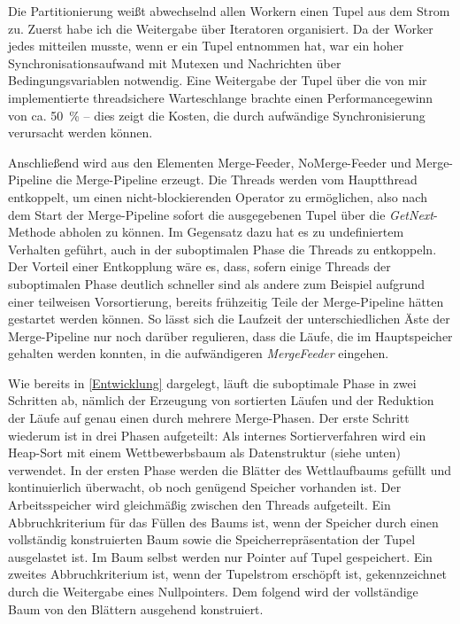 \documentclass[a4paper,12pt,twoside]{article}
\newcommand{\Fb}[1]{\textit{#1}} %
\begin{document}
Die Partitionierung weißt abwechselnd allen Workern einen Tupel aus dem Strom zu. Zuerst habe ich die Weitergabe über Iteratoren organisiert. Da der Worker jedes mitteilen musste, wenn er ein Tupel entnommen hat, war ein hoher Synchronisationsaufwand mit Mutexen und Nachrichten über Bedingungsvariablen notwendig. Eine Weitergabe der Tupel über die von mir implementierte threadsichere Warteschlange brachte einen Performancegewinn von ca. 50~\% -- dies zeigt die Kosten, die durch aufwändige Synchronisierung verursacht werden können.

Anschließend wird aus den Elementen Merge-Feeder, NoMerge-Feeder und Merge-Pipeline die Merge-Pipeline erzeugt. Die Threads werden vom Hauptthread entkoppelt, um einen nicht-blockierenden Operator zu ermöglichen, also nach dem Start der Merge-Pipeline sofort die ausgegebenen Tupel über die \Fb{GetNext}-Methode abholen zu können. Im Gegensatz dazu hat es zu undefiniertem Verhalten geführt, auch in der suboptimalen Phase die Threads zu entkoppeln. Der Vorteil einer Entkopplung wäre es, dass, sofern einige Threads der suboptimalen Phase deutlich schneller sind als andere zum Beispiel aufgrund einer teilweisen Vorsortierung, bereits frühzeitig Teile der Merge-Pipeline hätten gestartet werden können. So lässt sich die Laufzeit der unterschiedlichen Äste der Merge-Pipeline nur noch darüber regulieren, dass die Läufe, die im Hauptspeicher gehalten werden konnten, in die aufwändigeren \Fb{MergeFeeder} eingehen.

Wie bereits in \autoref{Entwicklung} dargelegt, läuft die suboptimale Phase in zwei Schritten ab, nämlich der Erzeugung von sortierten Läufen und der Reduktion der Läufe auf genau einen durch mehrere Merge-Phasen. Der erste Schritt wiederum ist in drei Phasen aufgeteilt: Als internes Sortierverfahren wird ein Heap-Sort mit einem Wettbewerbsbaum als Datenstruktur (siehe unten) verwendet. In der ersten Phase werden die Blätter des Wettlaufbaums gefüllt und kontinuierlich überwacht, ob noch genügend Speicher vorhanden ist. Der Arbeitsspeicher wird gleichmäßig zwischen den Threads aufgeteilt. Ein Abbruchkriterium für das Füllen des Baums ist, wenn der Speicher durch einen vollständig konstruierten Baum sowie die Speicherrepräsentation der Tupel ausgelastet ist. Im Baum selbst werden nur Pointer auf Tupel gespeichert. Ein zweites Abbruchkriterium ist, wenn der Tupelstrom erschöpft ist, gekennzeichnet durch die Weitergabe eines Nullpointers. Dem folgend wird der vollständige Baum von den Blättern ausgehend konstruiert.
\end{document}
